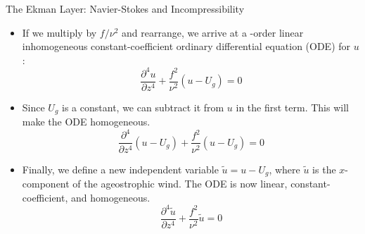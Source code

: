 \begin{frame}{The Ekman Layer: Navier-Stokes and Incompressibility}

\begin{itemize}
	\item If we multiply by $f/\nu^2$ and rearrange, we arrive at a -order linear inhomogeneous constant-coefficient ordinary differential equation (ODE) for $u$:
	$$\frac{\partial^4 u}{\partial z^4} + \frac{f^2}{\nu^2}\left(u - U_g\right) = 0$$
	\item Since $U_g$ is a constant, we can subtract it from $u$ in the first term. This will make the ODE homogeneous.
	$$\frac{\partial^4}{\partial z^4}\left(u - U_g\right) + \frac{f^2}{\nu^2}\left(u - U_g\right) = 0$$
	\item Finally, we define a new independent variable $\tilde u = u-U_g$, where $\tilde u$ is the $x$-component of the ageostrophic wind. The ODE is now linear, constant-coefficient, and homogeneous.
	\begin{equation}
		\boxed{\frac{\partial^4 \tilde u}{\partial z^4} + \frac{f^2}{\nu^2} \tilde u = 0} \label{eq3}
	\end{equation}
\end{itemize}
\end{frame}
